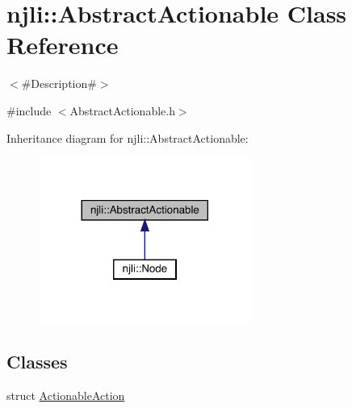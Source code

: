 \hypertarget{classnjli_1_1_abstract_actionable}{}\section{njli\+:\+:Abstract\+Actionable Class Reference}
\label{classnjli_1_1_abstract_actionable}


$<$\#\+Description\#$>$  




{\ttfamily \#include $<$Abstract\+Actionable.\+h$>$}



Inheritance diagram for njli\+:\+:Abstract\+Actionable\+:\nopagebreak
\begin{figure}[H]
\begin{center}
\leavevmode
\includegraphics[width=197pt]{classnjli_1_1_abstract_actionable__inherit__graph}
\end{center}
\end{figure}
\subsection*{Classes}
\begin{DoxyCompactItemize}
\item 
struct \mbox{\hyperlink{structnjli_1_1_abstract_actionable_1_1_actionable_action}{Actionable\+Action}}
\end{DoxyCompactItemize}
